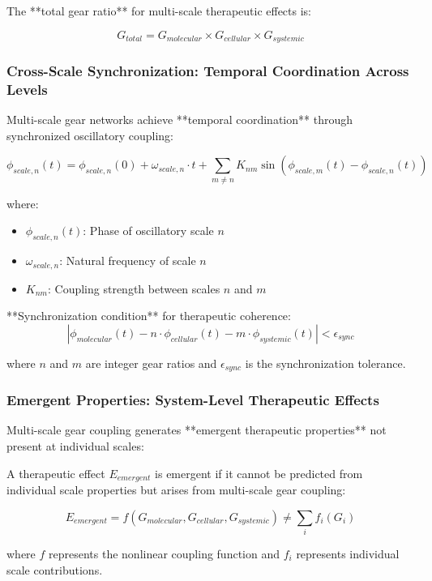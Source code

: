 The **total gear ratio** for multi-scale therapeutic effects is:

\begin{equation}
G_{total} = G_{molecular} \times G_{cellular} \times G_{systemic}
\end{equation}

\subsubsection{Cross-Scale Synchronization: Temporal Coordination Across Levels}

Multi-scale gear networks achieve **temporal coordination** through synchronized oscillatory coupling:

\begin{equation}
\phi_{scale,n}(t) = \phi_{scale,n}(0) + \omega_{scale,n} \cdot t + \sum_{m \neq n} K_{nm} \sin(\phi_{scale,m}(t) - \phi_{scale,n}(t))
\end{equation}

where:
\begin{itemize}
\item $\phi_{scale,n}(t)$: Phase of oscillatory scale $n$
\item $\omega_{scale,n}$: Natural frequency of scale $n$
\item $K_{nm}$: Coupling strength between scales $n$ and $m$
\end{itemize}

**Synchronization condition** for therapeutic coherence:
\begin{equation}
|\phi_{molecular}(t) - n \cdot \phi_{cellular}(t) - m \cdot \phi_{systemic}(t)| < \epsilon_{sync}
\end{equation}

where $n$ and $m$ are integer gear ratios and $\epsilon_{sync}$ is the synchronization tolerance.

\subsubsection{Emergent Properties: System-Level Therapeutic Effects}

Multi-scale gear coupling generates **emergent therapeutic properties** not present at individual scales:

\begin{definition}
A therapeutic effect $E_{emergent}$ is emergent if it cannot be predicted from individual scale properties but arises from multi-scale gear coupling:

\begin{equation}
E_{emergent} = f(G_{molecular}, G_{cellular}, G_{systemic}) \neq \sum_{i} f_i(G_i)
\end{equation}

where $f$ represents the nonlinear coupling function and $f_i$ represents individual scale contributions.
\end{definition}

